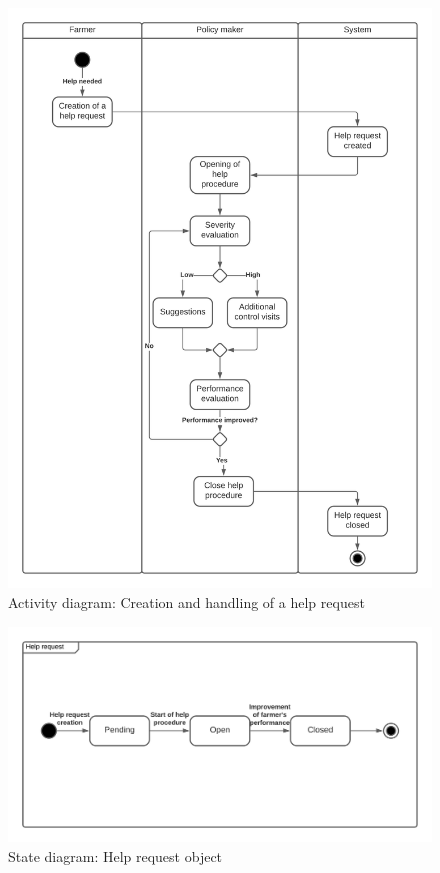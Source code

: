 \documentclass[10pt]{article}
\begin{document}
\begin{figure}[ht!]
    \centering
    \includegraphics[scale=0.48]{stateDiagrams/helpActivity.png}
    \caption{Activity diagram: Creation and handling of a help request}
    \label{fig:sd2}
\end{figure}
\begin{figure}[ht!]
    \centering
    \includegraphics[scale=0.48]{stateDiagrams/helpState.png}
    \caption{State diagram: Help request object}
    \label{fig:sd3}
\end{figure}
\end{document}
